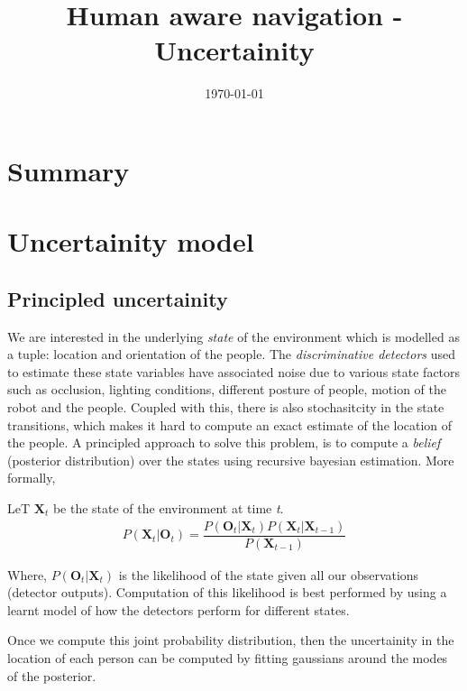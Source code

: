 \documentclass[11pt]{article}
\begin{document}
\title{Human aware navigation - Uncertainity}
\date{\today}
\maketitle


\section{Summary}

\section{Uncertainity model}

\subsection{Principled uncertainity}
We are interested in the underlying \textit{state} of the environment which is modelled as a tuple: location and orientation of the people. The \textit{discriminative detectors} used to estimate these state variables have associated noise due to various state factors such as occlusion, lighting conditions, different posture of people, motion of the robot and the people. Coupled with this, there is also stochasitcity in the state transitions, which makes it hard to compute an exact estimate of the location of the people. A principled approach to solve this problem, is to compute a \textit{belief} (posterior distribution) over the states using recursive bayesian estimation. More formally,

LeT $\textbf{X}_{t}$ be the state of the environment at time \textit{t}.
\begin{align}
P(\textbf{X}_{t} | \textbf{O}_{t}) = \dfrac{P(\textbf{O}_{t} | \textbf{X}_{t}) P(\textbf{X}_{t}|\textbf{X}_{t-1})} {P(\textbf{X}_{t-1})}
\end{align} 

Where, $P(\textbf{O}_{t} | \textbf{X}_{t})$ is the likelihood of the state given all our observations (detector outputs). Computation of this likelihood is best performed by using a learnt model of how the detectors perform for different states.

Once we compute this joint probability distribution, then the uncertainity in the location of each person can be computed by fitting gaussians around the modes of the posterior.
\end{document}
